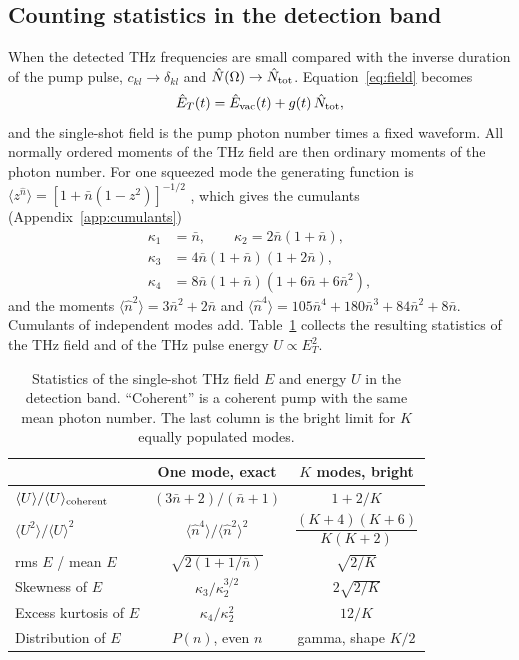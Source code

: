 \documentclass[aps,pra,reprint,superscriptaddress,amsmath,amssymb,floatfix]{revtex4-2}
\newcommand{\nbar}{\bar n}
\newcommand{\Nop}{\hat N}
\begin{document}
\subsection{Counting statistics in the detection band}

When the detected THz frequencies are small compared with the inverse
duration of the pump pulse, $c_{kl}\to\delta_{kl}$ and
$\Nop(\Omega)\to\Nop_{\rm tot}$. Equation~\eqref{eq:field} becomes
\begin{equation}
\hat E_T(t)=\hat E_{\rm vac}(t)+g(t)\,\Nop_{\rm tot},
\label{eq:lowfreq}
\end{equation}
and the single-shot field is the pump photon number times a fixed waveform.
All normally ordered moments of the THz field are then ordinary moments of
the photon number. For one squeezed mode the generating function is
$\langle z^{\hat n}\rangle=[1+\nbar(1-z^2)]^{-1/2}$ \cite{gerryknight2005},
which gives the cumulants (Appendix~\ref{app:cumulants})
\begin{align}
\kappa_1&=\nbar,\qquad \kappa_2=2\nbar(1+\nbar),\nonumber\\
\kappa_3&=4\nbar(1+\nbar)(1+2\nbar),\nonumber\\
\kappa_4&=8\nbar(1+\nbar)(1+6\nbar+6\nbar^2),
\label{eq:cumulants}
\end{align}
and the moments $\langle\hat n^2\rangle=3\nbar^2+2\nbar$ and
$\langle\hat n^4\rangle=105\nbar^4+180\nbar^3+84\nbar^2+8\nbar$. Cumulants of
independent modes add. Table~\ref{tab:stats} collects the resulting
statistics of the THz field and of the THz pulse energy $U\propto E_T^2$.

\begin{table}[!htb]
\caption{Statistics of the single-shot THz field $E$ and energy $U$ in the
detection band. ``Coherent'' is a coherent pump with the same mean photon
number. The last column is the bright limit for $K$ equally populated modes.}
\label{tab:stats}
\begin{ruledtabular}
\begin{tabular}{lcc}
 & One mode, exact & $K$ modes, bright\\
\hline
$\langle U\rangle/\langle U\rangle_{\rm coherent}$ &
 $(3\nbar+2)/(\nbar+1)$ & $1+2/K$\\
$\langle U^2\rangle/\langle U\rangle^2$ &
 $\langle\hat n^4\rangle/\langle\hat n^2\rangle^2$ &
 $\dfrac{(K+4)(K+6)}{K(K+2)}$\\
rms $E$ / mean $E$ & $\sqrt{2(1+1/\nbar)}$ & $\sqrt{2/K}$\\
Skewness of $E$ & $\kappa_3/\kappa_2^{3/2}$ & $2\sqrt{2/K}$\\
Excess kurtosis of $E$ & $\kappa_4/\kappa_2^{2}$ & $12/K$\\
Distribution of $E$ & $P(n)$, even $n$ & gamma, shape $K/2$\\
\end{tabular}
\end{ruledtabular}
\end{table}
\end{document}
